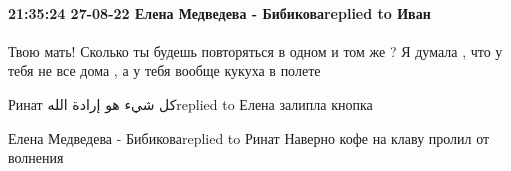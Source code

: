 
 
 
 
 

\paragraph{21:35:24 27-08-22 Елена Медведева - Бибиковаreplied to Иван}

Твою мать! Сколько ты будешь повторяться в одном и том же ? Я думала , что у
тебя не все дома , а у тебя вообще кукуха в полете

Ринат كل شيء هو إرادة اللهreplied to Елена
залипла кнопка

Елена Медведева - Бибиковаreplied to Ринат
Наверно кофе на клаву пролил от волнения
